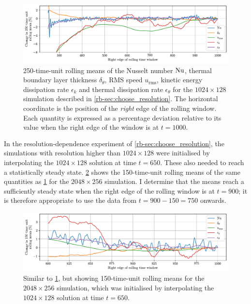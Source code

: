 \documentclass[../main.tex]{subfiles}
\begin{document}
\begin{figure}[ht]
    \centering
    \includegraphics[width=\linewidth]{figures/1024x128_spin_up.pdf}
    \caption{
        250-time-unit rolling means of the Nusselt number $\mathrm{Nu}$, thermal
        boundary layer thickness $\delta_\theta$, RMS speed $u_\mathrm{rms}$,
        kinetic energy dissipation rate $\epsilon_k$ and thermal dissipation
        rate $\epsilon_\theta$ for the $1024 \times 128$ simulation described
        in \cref{rb-sec:choose_resolution}. The horizontal coordinate is the
        position of the \emph{right} edge of the rolling window. Each quantity
        is expressed as a percentage deviation relative to its value when
        the right edge of the window is at $t=1000$.
    }
    \label{fig:1024x128_spin_up}
\end{figure}

In the resolution-dependence experiment of \cref{rb-sec:choose_resolution}, the
simulations with resolution higher than $1024 \times 128$ were initialised by
interpolating the $1024 \times 128$ solution at time $t = 650$. These also
needed to reach a statistically steady state. \cref{fig:2048x256_spin_up} shows
the 150-time-unit rolling means of the same quantities as
\cref{fig:1024x128_spin_up} for the $2048 \times 256$ simulation. I determine
that the means reach a sufficiently steady state when the right edge of the
rolling window is at $t=900$; it is therefore appropriate to use the data
from $t=900-150=750$ onwards.
\begin{figure}[ht]
    \centering
    \includegraphics[width=\linewidth]{figures/2048x256_spin_up.pdf}
    \caption{
        Similar to \cref{fig:1024x128_spin_up}, but showing 150-time-unit
        rolling means for the $2048 \times 256$ simulation, which was
        initialised by interpolating the $1024 \times 128$ solution at time
        $t=650$.
    }
    \label{fig:2048x256_spin_up}
\end{figure}
\end{document}
